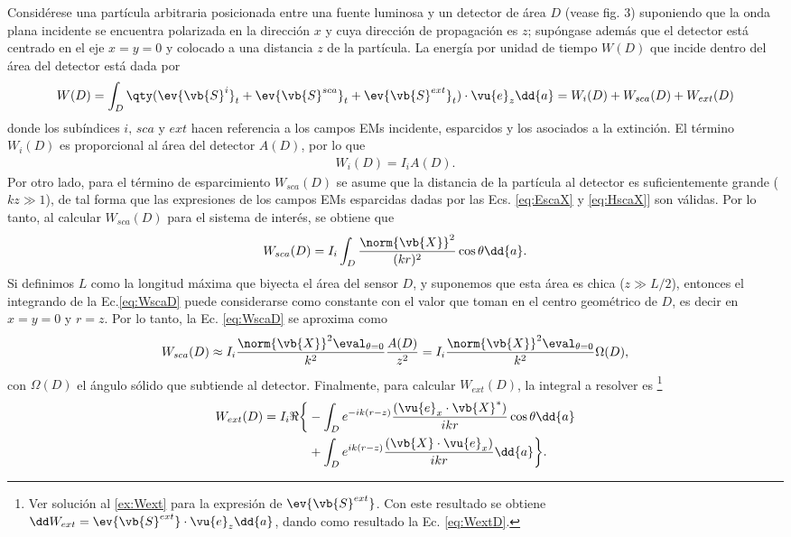 Considérese una partícula arbitraria posicionada entre una fuente luminosa y un detector de área $D$ (vease fig. 3) suponiendo que la onda plana incidente se encuentra polarizada en la dirección $x$ y cuya dirección de propagación es $z$; supóngase además que el detector está centrado en el eje $x=y=0$ y colocado a una distancia $z$ de la partícula. La energía por unidad de tiempo $W(D)$ que incide dentro del área del detector está dada por
%
\begin{align}
W(D) = \int_D\qty(\ev{\vb{S}^i}_t+\ev{\vb{S}^{sca}}_t+\ev{\vb{S}^{ext}}_t)\cdot\vu{e}_z\dd{a} = W_i(D) + W_{sca}(D) + W_{ext}(D)
\end{align}
%
donde los subíndices $i,\, sca$ y $ext$ hacen referencia a los campos EMs incidente, esparcidos y los asociados a la extinción. El término $W_i(D)$ es proporcional al área del detector $A(D)$, por lo que
%
\begin{align}
W_i (D) = I_iA(D).
\label{eq:WiD}
\end{align}
%
Por otro lado, para el término de esparcimiento $W_{sca}(D)$ se asume que la distancia de la partícula al detector es suficientemente grande ($kz\gg 1$), de tal forma que las expresiones de los campos EMs esparcidas  dadas por las Ecs. \eqref{eq:EscaX} y \eqref{eq:HscaX}]  son válidas. Por lo tanto, al calcular $W_{sca}(D)$ para el sistema de interés, se obtiene que 
%
\begin{align}
W_{sca}(D)  = I_i \int_D\frac{\norm{\vb{X}}^2}{(kr)^2}\cos\theta\dd{a}.
\label{eq:WscaD}
\end{align}
% 
Si definimos $L$ como la longitud máxima que biyecta el área del sensor $D$, y suponemos que esta área es chica ($z \gg L/2$), entonces el integrando de la Ec.\eqref{eq:WscaD} puede considerarse como constante con el valor que toman en el centro geométrico de $D$, es decir en $x=y=0$ y $r = z$. Por lo tanto, la Ec. \eqref{eq:WscaD} se aproxima como
%
\begin{align}
W_{sca}(D)\approx I_i \frac{\norm{\vb{X}}^2\eval_{\theta = 0}}{k^2}\frac{A(D)}{z^2} = 
 	I_i\frac{\norm{\vb{X}}^2\eval_{\theta = 0}}{k^2}\Omega(D),
\label{eq:WscaFullD}
\end{align}
%
con $\Omega(D)$ el ángulo sólido que subtiende al detector. Finalmente, para calcular $W_{ext}(D)$, la integral a resolver es \footnote{Ver solución al \ref{ex:Wext} para la expresión de $\ev{\vb{S}^{ext}}$. Con este resultado se obtiene $\dd W_{ext} = \ev{\vb{S}^{ext}}\cdot\vu{e}_z\dd{a}$, dando como resultado la Ec. \eqref{eq:WextD}.}
%
\begin{align}
W_{ext}(D) =  I_i\Re\bigg\{&
	-\int_D e^{-ik(r-z)}\frac{(\vu{e}_x\cdot\vb{X}^*)}{ikr}\cos\theta\dd{a}\notag\\
&+
	\int_D e^{ik(r-z)} \frac{(\vb{X}\cdot\vu{e}_x)}{ikr}\dd{a}
\bigg\}.
\label{eq:WextD}
\end{align}
